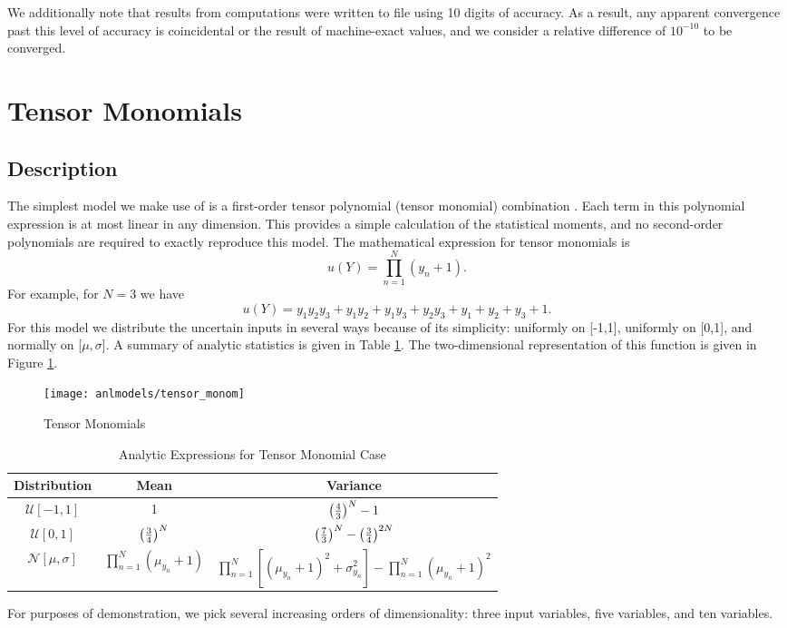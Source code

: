 We additionally note that results from \raven{} computations were written to file using 10 digits of accuracy.
As a result, any apparent convergence past this level of accuracy is coincidental or the result of
machine-exact values, and we consider a relative difference of $10^{-10}$ to be converged.




\section{Tensor Monomials}
\subsection{Description}
The simplest model we make use of is a first-order tensor polynomial (tensor monomial) combination \cite{Ayres}.
Each term in this polynomial expression is at most linear in any dimension.  This provides a simple calculation
of the statistical moments, and no second-order polynomials are required to exactly reproduce this model.
The mathematical expression for tensor monomials is
\begin{equation}
  u(Y) = \prod_{n=1}^N (y_n+1).
\end{equation}
For example, for $N=3$ we have
\begin{equation}
  u(Y) = y_1y_2y_3 + y_1y_2 + y_1y_3 + y_2y_3 + y_1 + y_2 + y_3 + 1.
\end{equation}
For this model we distribute the uncertain inputs in several ways because of its simplicity: uniformly on [-1,1], uniformly on
[0,1], and normally on [$\mu,\sigma$]. A summary of analytic statistics is given in Table \ref{tab:tensormono moments}.
The two-dimensional representation of this function is given in Figure \ref{fig: tensor monomials}.
\begin{figure}[htb]
  \centering
  \texttt{[image: anlmodels/tensor\_monom]}
  \caption{Tensor Monomials}
  \label{fig: tensor monomials}
\end{figure}

\begin{table}[H]
  \centering
  \begin{tabular}{c|c|c}
    Distribution & Mean & Variance \\\hline
    $\mathcal{U}[-1,1]$ & 1 & $\qty(\frac{4}{3})^N - 1$ \\
    $\mathcal{U}[0,1]$ & $\qty(\frac{3}{4})^N$ & $\qty(\frac{7}{3})^N - \qty(\frac{3}{4})^{2N}$ \\
    $\mathcal{N}[\mu,\sigma]$ & $\prod_{n=1}^N (\mu_{y_n}+1)$ & $\prod_{n=1}^N[(\mu_{y_n}+1)^2+\sigma_{y_n}^2]
    - \prod_{n=1}^N (\mu_{y_n}+1)^2$
  \end{tabular}
  \caption{Analytic Expressions for Tensor Monomial Case}
  \label{tab:tensormono moments}
\end{table}
For purposes of demonstration, we pick several increasing orders of dimensionality: three input variables, five variables, and
ten variables.

